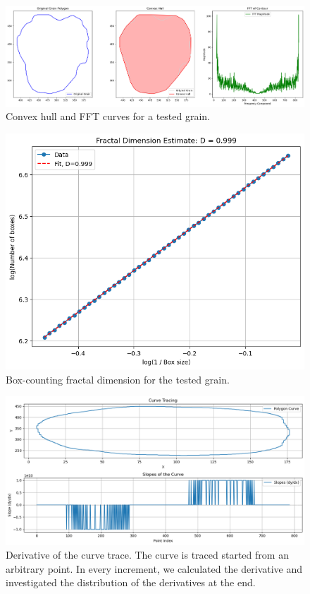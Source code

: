 \documentclass{article}
\begin{document}
\begin{figure}[H]
    \centering
    \includegraphics[width=\textwidth]{convex_hull_fft.png}
    \caption{Convex hull and FFT curves for a tested grain.}
    \label{fig:convex_hull_fft}
\end{figure}
\begin{figure}[H]
    \centering
    \includegraphics[width=\textwidth]{fractal.png}
    \caption{Box-counting fractal dimension for the tested grain.}
    \label{fig:fractal}
\end{figure}
\begin{figure}[H]
    \centering
    \includegraphics[width=\textwidth]{derivative_tracing.png}
    \caption{Derivative of the curve trace. The curve is traced started from an arbitrary point. In every increment, we calculated the derivative and investigated the distribution of the derivatives at the end.}
    \label{fig:derivative_tracing}
\end{figure}
\end{document}
